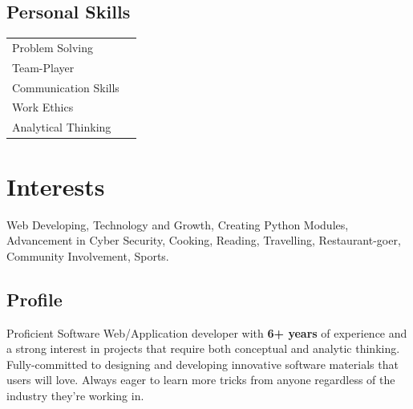 \documentclass[a4paper,10pt,oneside]{article}
\begin{document}
\begin{sloppypar}
\begin{paracol}{2}
\begin{leftcolumn}
\begin{flushleft}
\section*{Personal Skills}
\vspace{-1em}
\begin{flushleft}
    \begin{tabular}[b]{m{13em} m{10em}}
        \Large Problem Solving &  \\
        \Large Team-Player & \\
        \Large Communication Skills & \\
        \Large Work Ethics & \\
        \Large Analytical Thinking & \\
    \end{tabular}
\end{flushleft}\end{flushleft}

\vspace{-1em}
\section*{Interests}
\begin{details}
Web Developing, Technology and Growth, Creating Python Modules, Advancement in Cyber Security, Cooking, Reading, Travelling, Restaurant-goer, Community Involvement, Sports.
\end{details}

\end{leftcolumn}

\begin{rightcolumn}

\section*{Profile}
\large{ Proficient Software Web/Application developer with \textbf{6+ years} of experience and a strong interest in projects that require both conceptual and analytic thinking. Fully-committed to designing and developing innovative software materials that users will love. Always eager to learn more tricks from anyone regardless of the industry they're working in. }


\end{rightcolumn}
\end{paracol}
\end{sloppypar}
\end{document}
